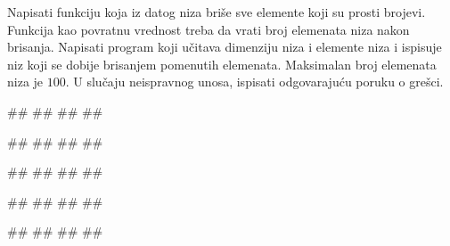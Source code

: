 \ifresenja
\begin{Answer}[ref=deljivi_indeksom]
\end{Answer}
\fi


\begin{Exercise}[label=p.izbacivanje_prostih_elemenata] 
Napisati funkciju koja iz datog niza briše sve elemente koji su prosti brojevi. 
Funkcija kao povratnu vrednost treba da vrati broj elemenata niza nakon brisanja. 
Napisati program koji učitava dimenziju niza i elemente niza i ispisuje niz koji se dobije 
brisanjem pomenutih elemenata.
Maksimalan broj elemenata niza je $100$.
U slučaju neispravnog unosa, ispisati odgovarajuću poruku o grešci. 

\begin{miditest}
\begin{upotreba}{1}
#\naslovInt#
##
##
##
\end{upotreba}
\end{miditest}
\begin{miditest}
\begin{upotreba}{2}
#\naslovInt#
##
##
##
\end{upotreba}
\end{miditest}

\begin{miditest}
\begin{upotreba}{3}
#\naslovInt#
##
##
##
\end{upotreba}
\end{miditest}
\begin{miditest}
\begin{upotreba}{4}
#\naslovInt#
##
##
#\izlaz{}#
\end{upotreba}
\end{miditest}

\begin{miditest}
\begin{upotreba}{5}
#\naslovInt#
##
##
##
\end{upotreba}
\end{miditest}
\end{Exercise}

